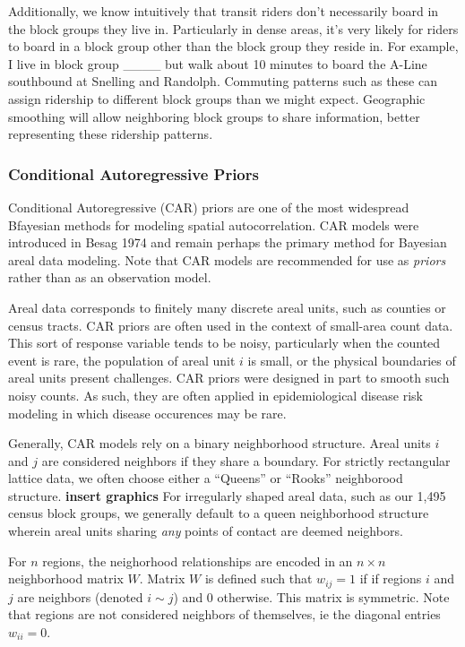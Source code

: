 \documentclass[
]{article}
\begin{document}
Additionally, we know intuitively that transit riders don't necessarily
board in the block groups they live in. Particularly in dense areas,
it's very likely for riders to board in a block group other than the
block group they reside in. For example, I live in block group \_\_\_\_
but walk about 10 minutes to board the A-Line southbound at Snelling and
Randolph. Commuting patterns such as these can assign ridership to
different block groups than we might expect. Geographic smoothing will
allow neighboring block groups to share information, better representing
these ridership patterns.

\hypertarget{conditional-autoregressive-priors}{%
\subsubsection{Conditional Autoregressive
Priors}\label{conditional-autoregressive-priors}}

Conditional Autoregressive (CAR) priors are one of the most widespread
Bfayesian methods for modeling spatial autocorrelation. CAR models were
introduced in Besag 1974 and remain perhaps the primary method for
Bayesian areal data modeling. Note that CAR models are recommended for
use as \emph{priors} rather than as an observation model.

Areal data corresponds to finitely many discrete areal units, such as
counties or census tracts. CAR priors are often used in the context of
small-area count data. This sort of response variable tends to be noisy,
particularly when the counted event is rare, the population of areal
unit \(i\) is small, or the physical boundaries of areal units present
challenges. CAR priors were designed in part to smooth such noisy
counts. As such, they are often applied in epidemiological disease risk
modeling in which disease occurences may be rare.

Generally, CAR models rely on a binary neighborhood structure. Areal
units \(i\) and \(j\) are considered neighbors if they share a boundary.
For strictly rectangular lattice data, we often choose either a
``Queens'' or ``Rooks'' neighborood structure. \textbf{insert graphics}
For irregularly shaped areal data, such as our 1,495 census block
groups, we generally default to a queen neighborhood structure wherein
areal units sharing \emph{any} points of contact are deemed neighbors.

For \(n\) regions, the neighorhood relationships are encoded in an
\(n \times n\) neighborhood matrix \(W\). Matrix \(W\) is defined such
that \(w_{ij} = 1\) if if regions \(i\) and \(j\) are neighbors (denoted
\(i \sim j\)) and 0 otherwise. This matrix is symmetric. Note that
regions are not considered neighbors of themselves, ie the diagonal
entries \(w_{ii} = 0\).
\end{document}
